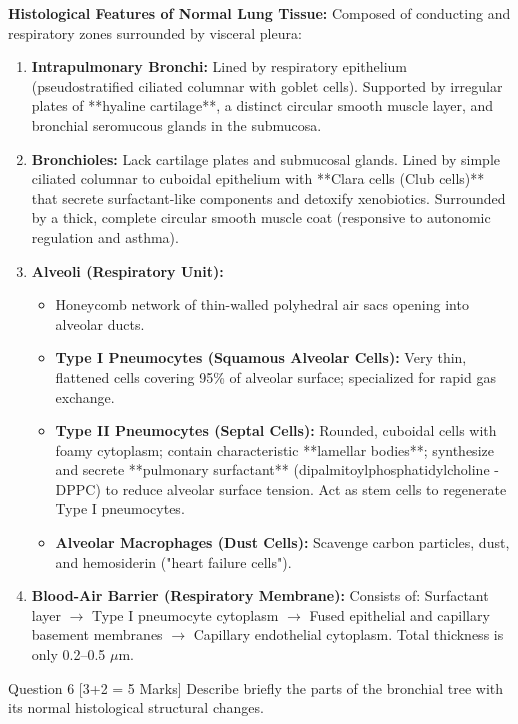 \documentclass[11pt,a4paper]{article}
\begin{document}
\begin{ansbox}
\textbf{Histological Features of Normal Lung Tissue:}
Composed of conducting and respiratory zones surrounded by visceral pleura:
\begin{enumerate}[leftmargin=*]
    \item \textbf{Intrapulmonary Bronchi:} Lined by respiratory epithelium (pseudostratified ciliated columnar with goblet cells). Supported by irregular plates of **hyaline cartilage**, a distinct circular smooth muscle layer, and bronchial seromucous glands in the submucosa.
    \item \textbf{Bronchioles:} Lack cartilage plates and submucosal glands. Lined by simple ciliated columnar to cuboidal epithelium with **Clara cells (Club cells)** that secrete surfactant-like components and detoxify xenobiotics. Surrounded by a thick, complete circular smooth muscle coat (responsive to autonomic regulation and asthma).
    \item \textbf{Alveoli (Respiratory Unit):}
    \begin{itemize}
        \item Honeycomb network of thin-walled polyhedral air sacs opening into alveolar ducts.
        \item \textbf{Type I Pneumocytes (Squamous Alveolar Cells):} Very thin, flattened cells covering 95\% of alveolar surface; specialized for rapid gas exchange.
        \item \textbf{Type II Pneumocytes (Septal Cells):} Rounded, cuboidal cells with foamy cytoplasm; contain characteristic **lamellar bodies**; synthesize and secrete **pulmonary surfactant** (dipalmitoylphosphatidylcholine - DPPC) to reduce alveolar surface tension. Act as stem cells to regenerate Type I pneumocytes.
        \item \textbf{Alveolar Macrophages (Dust Cells):} Scavenge carbon particles, dust, and hemosiderin ("heart failure cells").
    \end{itemize}
    \item \textbf{Blood-Air Barrier (Respiratory Membrane):}
    Consists of: Surfactant layer $\rightarrow$ Type I pneumocyte cytoplasm $\rightarrow$ Fused epithelial and capillary basement membranes $\rightarrow$ Capillary endothelial cytoplasm. Total thickness is only 0.2--0.5 $\mu$m.
\end{enumerate}
\end{ansbox}

\begin{qbox}{Question 6 [3+2 = 5 Marks]}
Describe briefly the parts of the bronchial tree with its normal histological structural changes.
\end{qbox}
\end{document}
